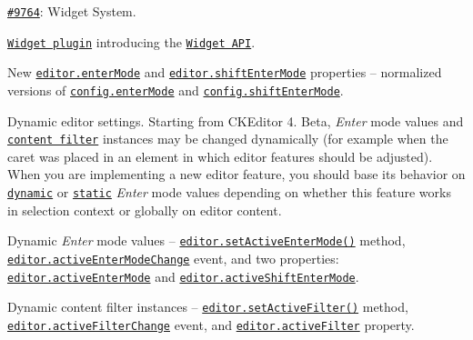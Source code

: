 {\ttfamily 
\begin{DoxyItemize}
\item \href{http://dev.ckeditor.com/ticket/9764}{\tt \#9764}\+: Widget System.
\begin{DoxyItemize}
\item \href{http://ckeditor.com/addon/widget}{\tt Widget plugin} introducing the \href{http://docs.ckeditor.com/#!/api/CKEDITOR.plugins.widget}{\tt Widget A\+PI}.
\item New \href{http://docs.ckeditor.com/#!/api/CKEDITOR.editor-property-enterMode}{\tt {\ttfamily editor.\+enter\+Mode}} and \href{http://docs.ckeditor.com/#!/api/CKEDITOR.editor-property-shiftEnterMode}{\tt {\ttfamily editor.\+shift\+Enter\+Mode}} properties -- normalized versions of \href{http://docs.ckeditor.com/#!/api/CKEDITOR.config-cfg-enterMode}{\tt {\ttfamily config.\+enter\+Mode}} and \href{http://docs.ckeditor.com/#!/api/CKEDITOR.config-cfg-shiftEnterMode}{\tt {\ttfamily config.\+shift\+Enter\+Mode}}.
\item Dynamic editor settings. Starting from C\+K\+Editor 4. Beta, {\itshape Enter} mode values and \href{http://docs.ckeditor.com/#!/guide/dev_advanced_content_filter}{\tt content filter} instances may be changed dynamically (for example when the caret was placed in an element in which editor features should be adjusted). When you are implementing a new editor feature, you should base its behavior on \href{http://docs.ckeditor.com/#!/api/CKEDITOR.editor-property-activeEnterMode}{\tt dynamic} or \href{http://docs.ckeditor.com/#!/api/CKEDITOR.editor-property-enterMode}{\tt static} {\itshape Enter} mode values depending on whether this feature works in selection context or globally on editor content.
\begin{DoxyItemize}
\item Dynamic {\itshape Enter} mode values -- \href{http://docs.ckeditor.com/#!/api/CKEDITOR.editor-method-setActiveEnterMode}{\tt {\ttfamily editor.\+set\+Active\+Enter\+Mode()}} method, \href{http://docs.ckeditor.com/#!/api/CKEDITOR.editor-event-activeEnterModeChange}{\tt {\ttfamily editor.\+active\+Enter\+Mode\+Change}} event, and two properties\+: \href{http://docs.ckeditor.com/#!/api/CKEDITOR.editor-property-activeEnterMode}{\tt {\ttfamily editor.\+active\+Enter\+Mode}} and \href{http://docs.ckeditor.com/#!/api/CKEDITOR.editor-property-activeShiftEnterMode}{\tt {\ttfamily editor.\+active\+Shift\+Enter\+Mode}}.
\item Dynamic content filter instances -- \href{http://docs.ckeditor.com/#!/api/CKEDITOR.editor-method-setActiveFilter}{\tt {\ttfamily editor.\+set\+Active\+Filter()}} method, \href{http://docs.ckeditor.com/#!/api/CKEDITOR.editor-event-activeFilterChange}{\tt {\ttfamily editor.\+active\+Filter\+Change}} event, and \href{http://docs.ckeditor.com/#!/api/CKEDITOR.editor-property-activeFilter}{\tt {\ttfamily editor.\+active\+Filter}} property.

\end{DoxyItemize}
\end{DoxyItemize}
\end{DoxyItemize}}
